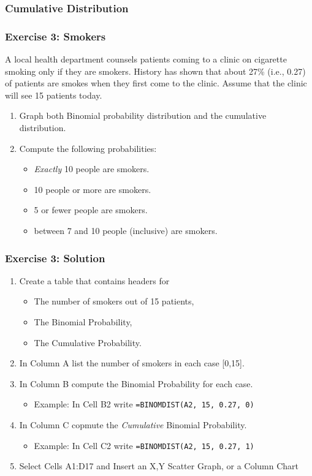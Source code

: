 \documentclass[12pt]{beamer}
\begin{document}
	\begin{frame}
		\frametitle{Cumulative Distribution}
	\end{frame}
	\begin{frame}
		\frametitle{Exercise 3: Smokers}
		A local health department counsels patients coming to a clinic on cigarette smoking only if they are smokers. History has shown that about 27\% (i.e., 0.27) of patients are smokes when they first come to the clinic. Assume that the clinic will see 15 patients today.\\
		\bigskip
		\begin{enumerate}
			\item Graph both Binomial probability distribution and the cumulative distribution.
			\item Compute the following probabilities:
				\begin{itemize}
					\item \textit{Exactly} 10 people are smokers.
					\item 10 people or more are smokers.
					\item 5 or fewer people are smokers.
					\item between 7 and 10 people (inclusive) are smokers.
				\end{itemize}
		\end{enumerate} 
	\end{frame}
	\begin{frame}
	\frametitle{Exercise 3: Solution}
		\begin{enumerate}
			\item Create a table that contains headers for 
			\begin{itemize}
				 \item The number of smokers out of 15 patients, 
				 \item The Binomial Probability,
				 \item The Cumulative Probability.
			\end{itemize}
			\item In Column A list the number of smokers in each case [0,15].
			\item In Column B compute the Binomial Probability for each case. 
				\begin{itemize}
					\item Example: In Cell B2 write \texttt{=BINOMDIST(A2, 15, 0.27, 0)}
				\end{itemize}
			\item In Column C copmute the \textit{Cumulative} Binomial Probability.
				\begin{itemize}
					\item Example: In Cell C2 write \texttt{=BINOMDIST(A2, 15, 0.27, 1)}
				\end{itemize}
			\item Select Cells A1:D17 and Insert an X,Y Scatter Graph, or a Column Chart 
			\end{enumerate}
	\end{frame}
\end{document}
